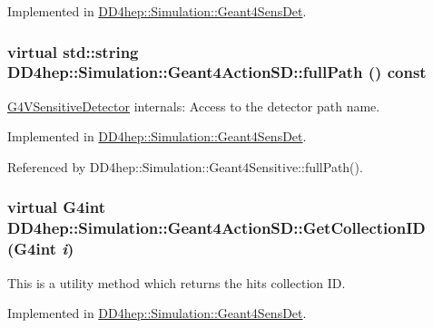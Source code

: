 Implemented in \hyperlink{class_d_d4hep_1_1_simulation_1_1_geant4_sens_det_af75a2eab653115fffe05ccb32828a461}{DD4hep::Simulation::Geant4SensDet}.\hypertarget{class_d_d4hep_1_1_simulation_1_1_geant4_action_s_d_afaba405dfb4c663ba2403ad4558d9956}{
\subsubsection[{fullPath}]{\setlength{\rightskip}{0pt plus 5cm}virtual std::string DD4hep::Simulation::Geant4ActionSD::fullPath () const}}
\label{class_d_d4hep_1_1_simulation_1_1_geant4_action_s_d_afaba405dfb4c663ba2403ad4558d9956}


\hyperlink{class_g4_v_sensitive_detector}{G4VSensitiveDetector} internals: Access to the detector path name. 

Implemented in \hyperlink{class_d_d4hep_1_1_simulation_1_1_geant4_sens_det_a7abea9524758bf79778a0b32edb280ae}{DD4hep::Simulation::Geant4SensDet}.

Referenced by DD4hep::Simulation::Geant4Sensitive::fullPath().\hypertarget{class_d_d4hep_1_1_simulation_1_1_geant4_action_s_d_ac0539610b17b20d10592201b1eb0755d}{
\subsubsection[{GetCollectionID}]{\setlength{\rightskip}{0pt plus 5cm}virtual G4int DD4hep::Simulation::Geant4ActionSD::GetCollectionID (G4int {\em i})}}
\label{class_d_d4hep_1_1_simulation_1_1_geant4_action_s_d_ac0539610b17b20d10592201b1eb0755d}


This is a utility method which returns the hits collection ID. 

Implemented in \hyperlink{class_d_d4hep_1_1_simulation_1_1_geant4_sens_det_acabf73f9ac2fd034b02bb24d12db8347}{DD4hep::Simulation::Geant4SensDet}.

